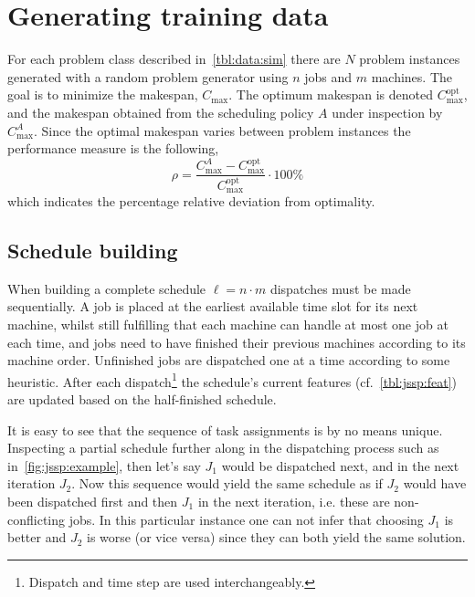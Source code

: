 \documentclass[smallextended]{svjour3}
\begin{document}
\section{Generating training data}\label{sec:gentrainingdata}
For each problem class described in~\cref{tbl:data:sim} there are $N$ problem instances generated  with a random problem generator using $n$ jobs and $m$ machines. 
The goal is to minimize the makespan, $C_{\max}$. The optimum makespan is denoted $C_{\max}^{\text{opt}}$, and the makespan obtained from the scheduling policy $A$ under inspection by $C_{\max}^{A}$. Since the optimal makespan varies between problem instances the performance measure is the following, 
\begin{equation}\label{eq:ratio}\rho=\frac{C_{\max}^{A}-C_{\max}^{\text{opt}}}{C_{\max}^{\text{opt}}}\cdot 100\%\end{equation}
which indicates the percentage relative deviation from optimality. %

\subsection{Schedule building}\label{sec:gen:gametree}
When building a complete schedule $\ell=n\cdot m$ dispatches must be made sequentially. 
A job is placed at the earliest available time slot for its next machine, whilst still fulfilling that each machine can handle at most one job at each time, and jobs need to have finished their previous machines according to its machine order. 
Unfinished jobs are dispatched one at a time according to some heuristic. After each dispatch\footnote{Dispatch and time step are used interchangeably.} the schedule's current features (cf.~\cref{tbl:jssp:feat}) are updated based on the half-finished schedule. 

It is easy to see that the sequence of task assignments is by no means unique. Inspecting a partial schedule further along in the dispatching process such as in~\cref{fig:jssp:example}, then let's say $J_1$ would be dispatched next, and in the next iteration $J_2$. Now this sequence would yield the same schedule as if $J_2$ would have been dispatched first and then $J_1$ in the next iteration, i.e. these are non-conflicting jobs. 
In this particular instance one can not infer that choosing $J_1$ is better and $J_2$ is worse (or vice versa) since they can both yield the same solution.
\end{document}
